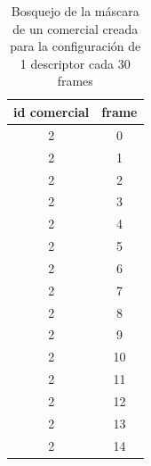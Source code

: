 \documentclass[14pt,letterpaper,hidelinks]{extarticle}
\begin{document}
\begin{table}[ht!]
\centering
\begin{tabular}{@{}cc@{}}
\toprule
id comercial & frame \\ \midrule
2 & 0 \\
2 & 1 \\
2 & 2 \\
2 & 3 \\
2 & 4 \\
2 & 5 \\
2 & 6 \\
2 & 7 \\
2 & 8 \\
2 & 9 \\
2 & 10 \\
2 & 11 \\
2 & 12 \\
2 & 13 \\
2 & 14 \\ \bottomrule
\end{tabular}
\captionsetup{justification=centering,margin=2cm}
\caption{Bosquejo de la máscara de un comercial creada para la configuración de 1 descriptor cada 30 frames\label{tab:mask}}
\end{table}
\end{document}
